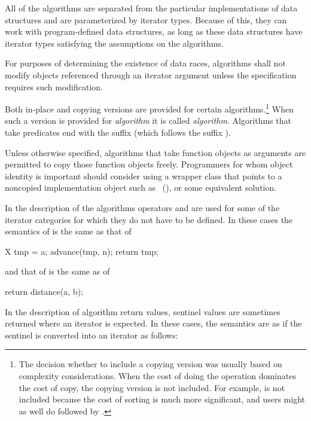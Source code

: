 \pnum
All of the algorithms are separated from the particular implementations of data structures and are
parameterized by iterator types.
Because of this, they can work with program-defined data structures, as long
as these data structures have iterator types satisfying the assumptions on the algorithms.

\pnum
For purposes of determining the existence of data races, algorithms shall
not modify objects referenced through an iterator argument unless the
specification requires such modification.

\pnum
Both in-place and copying versions are provided for certain
algorithms.\footnote{The decision whether to include a copying version was
usually based on complexity considerations. When the cost of doing the operation
dominates the cost of copy, the copying version is not included. For example,
 is not included because the cost of sorting is much more
significant, and users might as well do  followed by .}
When such a version is provided for \textit{algorithm} it is called
\textit{algorithm}. Algorithms that take predicates end with the
suffix  (which follows the suffix ).

\pnum
\enternote
Unless otherwise specified, algorithms that take function objects as arguments
are permitted to copy those function objects freely. Programmers for whom object
identity is important should consider using a wrapper class that points to a
noncopied implementation object such as ~(), or some equivalent solution.
\exitnote

\pnum
In the description of the algorithms operators
\tcode{+}
and
\tcode{-}
are used for some of the iterator categories for which
they do not have to be defined.
In these cases the semantics of
is the same as that of

\begin{codeblock}
X tmp = a;
advance(tmp, n);
return tmp;
\end{codeblock}

and that of
is the same as of

\begin{codeblock}
return distance(a, b);
\end{codeblock}

\pnum
In the description of algorithm return values, sentinel values are sometimes
returned where an iterator is expected. In these cases, the semantics are as
if the sentinel is converted into an iterator as follows:

